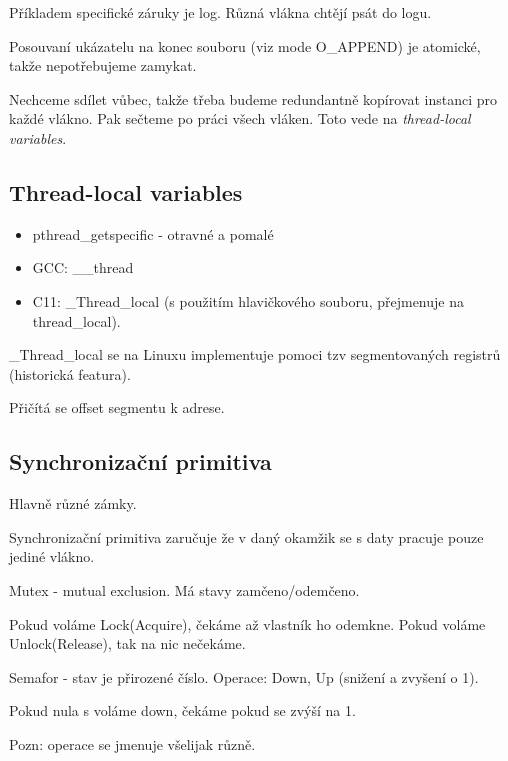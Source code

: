 \begin{example}
	Příkladem specifické záruky je log.
	Různá vlákna chtějí psát do logu.

	Posouvaní ukázatelu na konec souboru (viz mode O\_APPEND) je atomické, takže nepotřebujeme zamykat.
\end{example}

Nechceme sdílet vůbec, takže třeba budeme redundantně kopírovat instanci pro každé vlákno.
Pak sečteme po práci všech vláken.
Toto vede na \emph{thread-local variables}.

\subsection{Thread-local variables}

\begin{itemize}
	\item pthread\_getspecific - otravné a pomalé
	\item GCC: \_\_thread
	\item C11: \_Thread\_local (s použitím hlavičkového souboru, přejmenuje na thread\_local).
\end{itemize}

\begin{note}
	\_Thread\_local se na Linuxu implementuje pomoci tzv segmentovaných registrů (historická featura).

	Přičítá se offset segmentu k adrese.
\end{note}

\subsection{Synchronizační primitiva}

Hlavně různé zámky.
\begin{definition}
	Synchronizační primitiva zaručuje že v daný okamžik se s daty pracuje pouze jediné vlákno.
\end{definition}

\begin{definition}
	Mutex - mutual exclusion. Má stavy zamčeno/odemčeno.

	Pokud voláme Lock(Acquire), čekáme až vlastník ho odemkne.
	Pokud voláme Unlock(Release), tak na nic nečekáme.
\end{definition}

\begin{definition}
	Semafor - stav je přirozené číslo.
	Operace: Down, Up (snižení a zvyšení o 1).

	Pokud nula s voláme down, čekáme pokud se zvýší na 1.

	Pozn: operace se jmenuje všelijak různě.
\end{definition}

